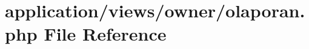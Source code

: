 \hypertarget{owner_2olaporan_8php}{}\section{application/views/owner/olaporan.php File Reference}
\label{owner_2olaporan_8php}
